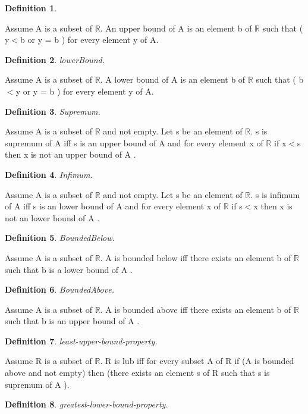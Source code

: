 \documentclass{article}
\newenvironment{forthel}{\begin{leftbar}}{\end{leftbar}}
\newtheorem{definition}{Definition}
\begin{document}
\begin{forthel}
\begin{definition}
\end{definition}
Assume A is a subset of $\mathbb{R}$.
An upper bound of A is an element b of $\mathbb{R}$ such that ( y$<$b or y = b ) for every element y of A.

\begin{definition} lowerBound.

\end{definition}
Assume A is a subset of $\mathbb{R}$.
A lower bound of A is an element b of $\mathbb{R}$ such that ( b$<$y or y = b ) for every element y of A.

\begin{definition} Supremum.

\end{definition}
Assume A is a subset of $\mathbb{R}$ and not empty.
Let s be an element of $\mathbb{R}$.
s is supremum of A  iff s is an upper bound of A 
and for every element x of $\mathbb{R}$ if x$<$s then x is not an upper bound of A .

\begin{definition} Infimum.

\end{definition}
Assume A is a subset of $\mathbb{R}$ and not empty.
Let s be an element of $\mathbb{R}$.
s is infimum of A  iff s is an lower bound of A 
and for every element x of $\mathbb{R}$ if s$<$x then x is not an lower bound of A .

\begin{definition} BoundedBelow.

\end{definition}
Assume A is a subset of $\mathbb{R}$.
A is bounded below  iff 
there exists an element b of $\mathbb{R}$ such that b is a lower bound of A .

\begin{definition} BoundedAbove.

\end{definition}
Assume A is a subset of $\mathbb{R}$.
A is bounded above  iff 
there exists an element b of $\mathbb{R}$ such that b is an upper bound of A .

\begin{definition} least-upper-bound-property.

\end{definition}
Assume R is a subset of $\mathbb{R}$.
R is lub iff for every subset A of R
if (A is bounded above and not empty) then (there exists an element s of R such that s is supremum of A ).

\begin{definition} greatest-lower-bound-property.


\end{definition}
\end{forthel}
\end{document}
